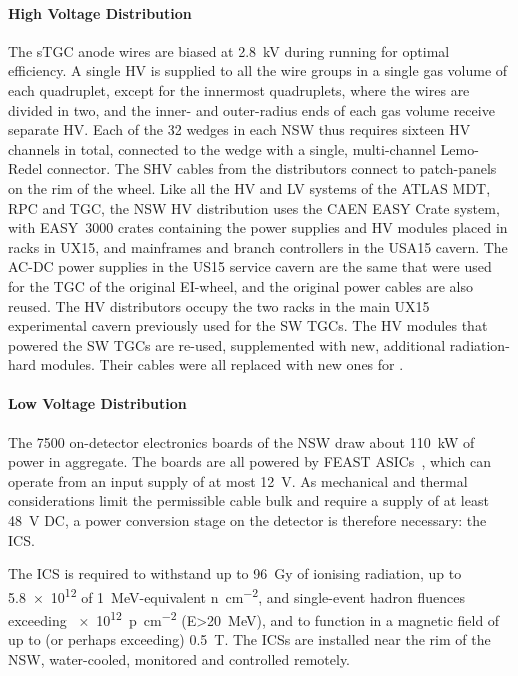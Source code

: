 \documentclass[cernpreprint, atlasdraft=false, UKenglish,british,orcidlogo, texmf, orcidlogo]{atlasdoc}
\begin{document}
\paragraph{High Voltage Distribution}
The \gls{sTGC} anode wires are biased at \SI{2.8}{\kilo\volt} during running for optimal efficiency. A single \gls{HV} is supplied to all the wire groups in a single gas volume of each quadruplet, except for the innermost quadruplets, where the wires are divided in two,
and the inner- and outer-radius ends of each gas volume receive separate \gls{HV}. Each of the 32 wedges in each \gls{NSW} thus requires sixteen \gls{HV} channels in total, connected to the wedge with a single, multi-channel Lemo-Redel connector.
The \gls{SHV} cables from the distributors connect to patch-panels on the rim of the wheel. 
Like all the \gls{HV} and \gls{LV} systems of the ATLAS \gls{MDT}, \gls{RPC} and \gls{TGC}, the \gls{NSW} \gls{HV} distribution uses the CAEN \gls{EASY} Crate system, with \gls{EASY}~3000 crates containing the power supplies and \gls{HV} modules placed in racks in UX15, and mainframes and branch controllers in the \gls{USA15} cavern. The AC-DC power supplies in the \gls{US15} service cavern are the same that were used for the \gls{TGC} of the original EI-wheel, and the original power cables are also reused.
The \gls{HV} distributors occupy the two racks in the main \gls{UX15} experimental cavern previously used for the \gls{SW} \glspl{TGC}.
The \gls{HV} modules that powered the \gls{SW} \glspl{TGC} are re-used, supplemented with new, additional radiation-hard modules.
Their cables were all replaced with new ones for \RunThr.
 
 
 
\paragraph{Low Voltage Distribution \label{muonParLV}}
The \num{7500} on-detector electronics boards of the \gls{NSW} draw about \SI{110}{\kilo\watt} of power in aggregate. 
The boards are all powered by \gls{FEAST} \glspl{ASIC}~\cite{FEAST}, which can operate from an input supply of at most \SI{12}{\volt}. As mechanical and thermal considerations limit the permissible cable bulk and require a supply of at least \SI{48}{\volt} DC,  a power conversion stage on the detector is therefore necessary: the \gls{ICS}.
 
The \gls{ICS} is required to withstand up to \SI{96}{\gray} of ionising radiation, up to \num{5.8e12} of \SI{1}{MeV}-equivalent \si{n\per\cm\squared}, 
and single-event hadron fluences exceeding \SI{e12}{p\per\cm\squared} (E>\SI{20}{\MeV}), and to function in a magnetic field of up to (or perhaps exceeding) \SI{0.5}{\tesla}. The \glspl{ICS} are installed near the rim of the \gls{NSW}, water-cooled, monitored and controlled remotely.
 
\end{document}

